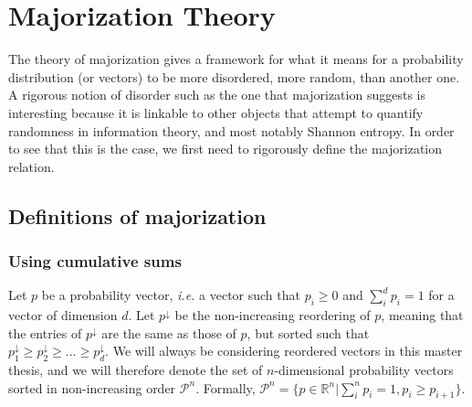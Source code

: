 \chapter{Majorization Theory} \label{chap:majorization}

The theory of majorization gives a framework for what it means for a probability distribution (or vectors) to be more disordered, more random, than another one. A rigorous notion of disorder such as the one that majorization suggests is interesting because it is linkable to other objects that attempt to quantify randomness in information theory, and most notably Shannon entropy. In order to see that this is the case, we first need to rigorously define the majorization relation.



\section{Definitions of majorization}

\subsection{Using cumulative sums}

Let $p$ be a probability vector, \textit{i.e.} a vector such that $p_i \geq 0$ and $\sum_{i}^{d} p_i = 1$ for a vector of dimension $d$. Let $p^\downarrow$ be the non-increasing reordering of $p$, meaning that the entries of $p^\downarrow$ are the same as those of $p$, but sorted such that $p^\downarrow_1 \geq p^\downarrow_2 \geq ... \geq p^\downarrow_d$. We will always be considering reordered vectors in this master thesis, and we will therefore denote the set of $n$-dimensional probability vectors sorted in non-increasing order $\mathcal{P}^n$. Formally, $\mathcal{P}^n = \{p \in \mathbb{R}^n | \sum_{i}^{n} p_i = 1, p_i \geq p_{i+1}\}$.

